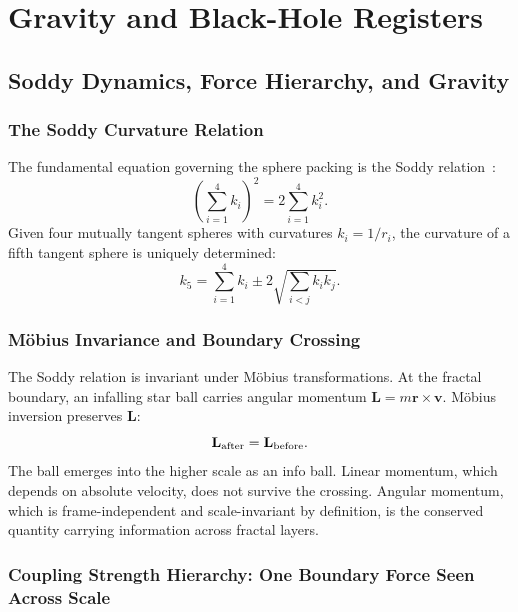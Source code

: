 \documentclass[11pt,a4paper]{article}
\begin{document}
\section{Gravity and Black-Hole Registers}


  \subsection{Soddy Dynamics, Force Hierarchy, and Gravity}

    \subsubsection{The Soddy Curvature Relation}

      The fundamental equation governing the sphere packing is the Soddy relation~\cite{Soddy1936,Boyd1973,Graham2003}:
      \[
      \left(\sum_{i=1}^4 k_i\right)^2 = 2\sum_{i=1}^4 k_i^2.
      \]
      Given four mutually tangent spheres with curvatures $k_i = 1/r_i$, the curvature of a fifth tangent sphere is uniquely determined:
      \[
      k_5 = \sum_{i=1}^4 k_i \pm 2\sqrt{\sum_{i<j} k_i k_j}.
      \]


    \subsubsection{Möbius Invariance and Boundary Crossing}

      The Soddy relation is invariant under Möbius transformations. At the fractal boundary, an infalling star ball carries angular momentum $\mathbf{L} = m\mathbf{r}\times\mathbf{v}$. Möbius inversion preserves $\mathbf{L}$:
      \[
      \mathbf{L}_{\rm after} = \mathbf{L}_{\rm before}.
      \]
      The ball emerges into the higher scale as an info ball. Linear momentum, which depends on absolute velocity, does not survive the crossing. Angular momentum, which is frame-independent and scale-invariant by definition, is the conserved quantity carrying information across fractal layers.

    \subsubsection{Coupling Strength Hierarchy: One Boundary Force Seen Across Scale}
    \label{sec:force_hierarchy}
\end{document}
